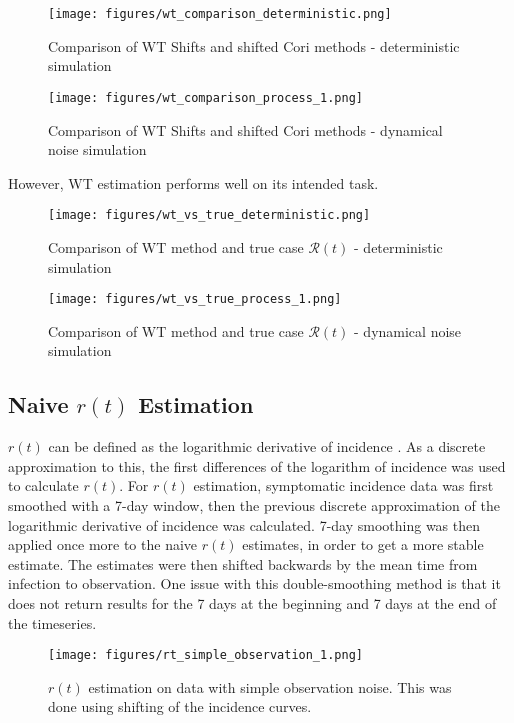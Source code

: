 \documentclass{article}
\newcommand{\nR}{\mathscr{R}}
\begin{document}
\begin{figure}[h!]
    \centering
    \texttt{[image: figures/wt\_comparison\_deterministic.png]}
    \caption{Comparison of WT Shifts and shifted Cori methods - deterministic simulation}
    \label{fig:my_label}
\end{figure}

\begin{figure}[h!]
    \centering
    \texttt{[image: figures/wt\_comparison\_process\_1.png]}
    \caption{Comparison of WT Shifts and shifted Cori methods - dynamical noise simulation}
    \label{fig:my_label}
\end{figure}

\clearpage
However, WT estimation performs well on its intended task.

\begin{figure}[h!]
    \centering
    \texttt{[image: figures/wt\_vs\_true\_deterministic.png]}
    \caption{Comparison of WT method and true case $\nR(t)$ - deterministic simulation}
    \label{fig:my_label}
\end{figure}

\begin{figure}[h!]
    \centering
    \texttt{[image: figures/wt\_vs\_true\_process\_1.png]}
    \caption{Comparison of WT method and true case $\nR(t)$ - dynamical noise simulation}
    \label{fig:my_label}
\end{figure}



\subsection{Naive $r(t)$ Estimation}
$r(t)$ can be defined as the logarithmic derivative of incidence \cite{Gostic}. As a discrete approximation to this, the first differences of the logarithm of incidence was used to calculate $r(t)$. For $r(t)$ estimation, symptomatic incidence data was first smoothed with a 7-day window, then the previous discrete approximation of the logarithmic derivative of incidence was calculated. 7-day smoothing was then applied once more to the naive $r(t)$ estimates, in order to get a more stable estimate. The estimates were then shifted backwards by the mean time from infection to observation. One issue with this double-smoothing method is that it does not return results for the 7 days at the beginning and 7 days at the end of the timeseries.

\begin{figure}[h!]
    \centering
    \texttt{[image: figures/rt\_simple\_observation\_1.png]}
    \caption{$r(t)$ estimation on data with simple observation noise. This was done using shifting of the incidence curves.}
\end{figure}
\end{document}
